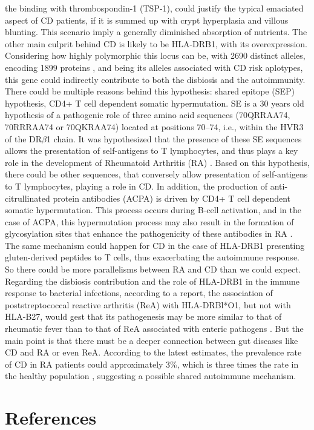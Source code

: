 \documentclass[12pt]{article}
\begin{document}
the binding with thrombospondin-1 (TSP-1), could justify the typical emaciated aspect of CD patients, if it is summed up with crypt hyperplasia and villous blunting. This scenario imply a generally diminished absorption of nutrients. The other main culprit behind CD is likely to be HLA-DRB1, with its overexpression. Considering how highly polymorphic this locus can be, with 2690 distinct alleles, encoding 1899 proteins \supercite{wysocki2020current}, and being its alleles associated with CD risk aplotypes, this gene could indirectly contribute to both the disbiosis and the autoimmunity. There could be multiple reasons behind this hypothesis: shared epitope (SEP) hypothesis, CD4+ T cell dependent somatic hypermutation. SE is a 30 years old hypothesis of a pathogenic role of three amino acid
sequences (70QRRAA74, 70RRRAA74 or 70QKRAA74) located at positions 70–74, i.e., within the HVR3 of the DR$\beta$1 chain. It was hypothesized that the presence of these SE sequences allows the presentation of self-antigens to T lymphocytes, and thus
plays a key role in the development of Rheumatoid Arthritis (RA) \supercite{gregersen1987shared}. Based on this hypothesis, there could be other sequences, that conversely allow presentation of self-antigens to T lymphocytes, playing a role in CD.  In addition, the production of anti-citrullinated protein antibodies (ACPA) is driven by CD4+ T cell dependent somatic hypermutation. This process occurs during B-cell activation, and in the case of ACPA, this hypermutation process may also result in the formation of glycosylation sites that enhance the pathogenicity of these antibodies in RA \supercite{wysocki2020current}. The same mechanism could happen for CD in the case of HLA-DRB1 presenting gluten-derived peptides to T cells, thus exacerbating the autoimmune response. So there could be more parallelisms between RA and CD than we could expect. Regarding the disbiosis contribution and the role of HLA-DRB1 in the immune response to bacterial infections, according to a report, the association of poststreptococcal reactive arthritis (ReA) with HLA-DRBl*O1, but not with HLA-B27, would
gest that its pathogenesis may be more similar to that
of rheumatic fever than to that of ReA associated with
enteric pathogens \supercite{shulman2002poststreptococcal}. But the main point is that there must be a deeper connection between gut diseases like CD and RA or even ReA. According to the latest estimates, the prevalence rate of CD in RA patients could
approximately 3\%, which is three times the rate in the healthy population \supercite{elhami2018prevalence}, suggesting a possible shared autoimmune mechanism.
\section{References}

\printbibliography[heading=none]
\end{document}
